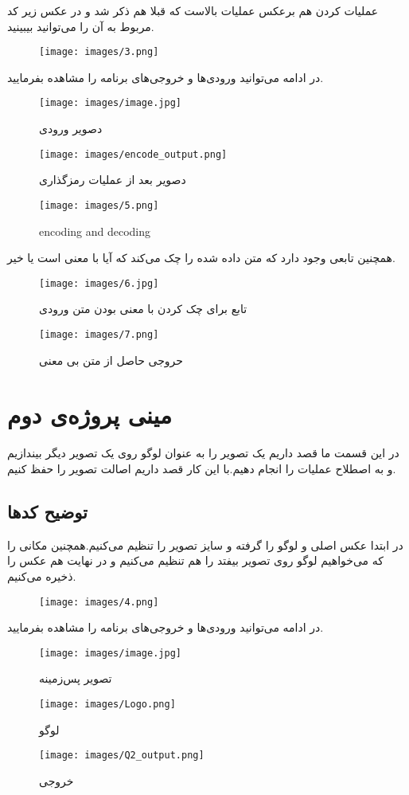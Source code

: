 عملیات
کردن هم برعکس عملیات بالاست که قبلا هم ذکر شد و در عکس زیر کد مربوط به آن را می‌توانید بیبینید.
\begin{figure}[H]
    \centering
    \texttt{[image: images/3.png]}
\end{figure}
در ادامه می‌توانید ورودی‌ها و خروجی‌های برنامه را مشاهده بفرمایید.
\begin{figure}[H]
    \centering
    \texttt{[image: images/image.jpg]}
    \caption{دصویر ورودی}
\end{figure}
\begin{figure}[H]
    \centering
    \texttt{[image: images/encode\_output.png]}
    \caption{دصویر بعد از عملیات رمزگذاری}
\end{figure}
\begin{figure}[H]
    \centering
    \texttt{[image: images/5.png]}
    \caption{encoding and decoding}
\end{figure}
همچنین تابعی وجود دارد که متن داده شده را چک می‌کند که آیا با معنی است یا خیر.
\begin{figure}[H]
    \centering
    \texttt{[image: images/6.jpg]}
    \caption{تابع برای چک کردن با معنی بودن متن ورودی}
\end{figure}
\begin{figure}[H]
    \centering
    \texttt{[image: images/7.png]}
    \caption{حروجی حاصل از متن بی معنی}
\end{figure}

\section{مینی پروژه‌ی دوم}
در این قسمت ما قصد داریم یک تصویر را به عنوان لوگو روی یک تصویر دیگر بیندازیم و به اصطلاح عملیات
را انجام دهیم.با این کار قصد داریم اصالت تصویر را حفظ کنیم.

\subsection{توضیح کد‌ها}
در ابتدا عکس اصلی و لوگو را گرفته و سایز تصویر را تنظیم می‌کنیم.همچنین مکانی را که می‌خواهیم لوگو روی تصویر بیفتد را هم تنظیم ‌می‌کنیم و در نهایت هم عکس را ذخیره‌ می‌کنیم.
\begin{figure}[H]
    \centering
    \texttt{[image: images/4.png]}
\end{figure}
در ادامه می‌توانید ورودی‌ها و خروجی‌های برنامه را مشاهده بفرمایید.

\begin{figure}[H]
    \centering
    \texttt{[image: images/image.jpg]}
    \caption{تصویر پس‌زمینه}
\end{figure}
\begin{figure}[H]
    \centering
    \texttt{[image: images/Logo.png]}
    \caption{لوگو}
\end{figure}
\begin{figure}[H]
    \centering
    \texttt{[image: images/Q2\_output.png]}
    \caption{خروجی}
\end{figure}